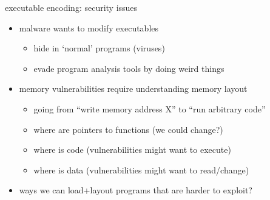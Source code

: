 \begin{frame}{executable encoding: security issues}
    \begin{itemize}
    \item malware wants to modify executables
        \begin{itemize}
        \item hide in `normal' programs (viruses)
        \item evade program analysis tools by doing weird things
        \end{itemize}
    \item memory vulnerabilities require understanding memory layout
        \begin{itemize}
        \item going from ``write memory address X'' to ``run arbitrary code''
        \item where are pointers to functions (we could change?)
        \item where is code (vulnerabilities might want to execute)
        \item where is data (vulnerabilities might want to read/change)
        \end{itemize}
    \item ways we can load+layout programs that are harder to exploit?
    \end{itemize}
\end{frame}

